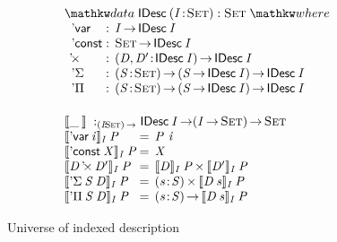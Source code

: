\begin{figure}

\[\stk{
\begin{array}{ll}
\stk{
\data \IDesc{(\Bhab{\V{I}}{\Set})} : \Set \where \\
\;\;\begin{array}{@{}l@{\::\:\:}l@{\quad}l}
    \DVar{\!}         & \V{I} \To \IDesc{\V{I}}                                       \\
    \DConst{\!}       & \Set \To \IDesc{\V{I}}                                        \\
    \DProd{\!}{\!}    & \PI{\V{\V{D}}, \V{\V{D'}}}{\IDesc{\V{I}}} \IDesc{\V{I}}       \\
    \DSigma{\!}{\!}   & \PI{\V{S}}{\Set} \PIS{\V{S} \To \IDesc{\V{I}}} \IDesc{\V{I}}  \\
    \DPi{\!}{\!}      & \PI{\V{S}}{\Set} \PIS{\V{S} \To \IDesc{\V{I}}} \IDesc{\V{I}} 
\end{array}
}
\vspace{0.2in}
\\
\stk{
\idescop{\_\:}{}{} :_{\PI{\V{I}}{\Set}} \IDesc{\V{I}} \To (\V{\V{I}} \To \Set) \To \Set                  \\
\begin{array}{@{}l@{\:=\:\:}ll}
\idescop{\DVar{\V{i}}}{\V{I}}{\V{P}}      &  \V{P}~\V{i}                                                 \\
\idescop{\DConst{\V{X}}}{\V{I}}{\V{P}}    &  \V{X}                                                   \\
\idescop{\DProd{\V{D}}{\V{D'}}}{\V{I}}{\V{P}} &  \TIMES{\idescop{\V{D}}{\V{I}}{\V{P}}}{\idescop{\V{D'}}{\V{I}}{\V{P}}}       \\
\idescop{\DSigma{\V{S}}{\V{D}}}{\V{I}}{\V{P}} &  \SIGMA{\V{s}}{\V{S}} \idescop{\V{D}\: \V{s}}{\V{I}}{\V{P}}                    \\
\idescop{\DPi{\V{S}}{\V{D}}}{\V{I}}{\V{P}}    &  \PI{\V{s}}{\V{S}} \idescop{\V{D}\: \V{s}}{\V{I}}{\V{P}}            
\end{array}
}
\end{array}
}\]

\caption{Universe of indexed description}
\label{fig:idesc}

\end{figure}


